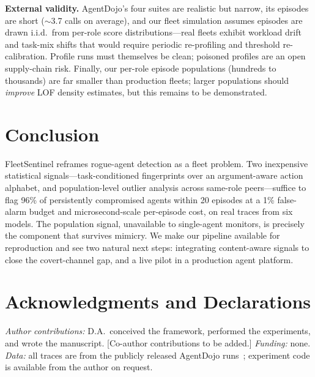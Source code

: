 \documentclass[conference]{IEEEtran}
\newcommand{\sys}{FleetSentinel}
\begin{document}
\textbf{External validity.} AgentDojo's four suites are realistic but narrow, its episodes are short ($\sim$3.7 calls on average), and our fleet simulation assumes episodes are drawn i.i.d.\ from per-role score distributions---real fleets exhibit workload drift and task-mix shifts that would require periodic re-profiling and threshold re-calibration. Profile runs must themselves be clean; poisoned profiles are an open supply-chain risk. Finally, our per-role episode populations (hundreds to thousands) are far smaller than production fleets; larger populations should \emph{improve} LOF density estimates, but this remains to be demonstrated.

\section{Conclusion}
\sys{} reframes rogue-agent detection as a fleet problem. Two inexpensive statistical signals---task-conditioned fingerprints over an argument-aware action alphabet, and population-level outlier analysis across same-role peers---suffice to flag 96\% of persistently compromised agents within 20 episodes at a 1\% false-alarm budget and microsecond-scale per-episode cost, on real traces from six models. The population signal, unavailable to single-agent monitors, is precisely the component that survives mimicry. We make our pipeline available for reproduction and see two natural next steps: integrating content-aware signals to close the covert-channel gap, and a live pilot in a production agent platform.

\section*{Acknowledgments and Declarations}
\textit{Author contributions:} D.A.\ conceived the framework, performed the experiments, and wrote the manuscript. [Co-author contributions to be added.] \textit{Funding:} none. \textit{Data:} all traces are from the publicly released AgentDojo runs~\cite{debenedetti2024agentdojo}; experiment code is available from the author on request.
\end{document}
